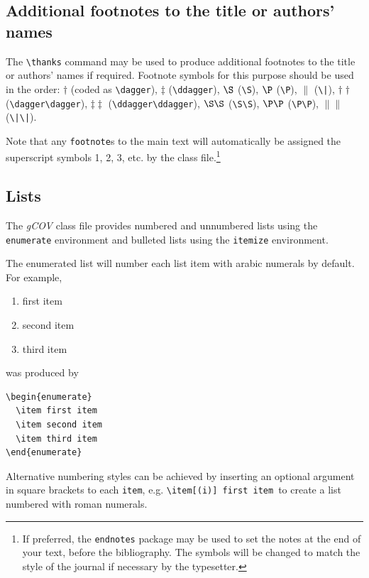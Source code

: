 \documentclass{gCOV2e}
\theoremstyle{plain}%
\theoremstyle{definition}
\theoremstyle{remark}
\begin{document}
\subsection{Additional footnotes to the title or authors' names}

The \verb"\thanks" command may be used to produce additional footnotes to the title or authors' names if required.
Footnote symbols for this purpose should be used in the order:
$\dagger$ (coded as \verb"\dagger"), $\ddagger$ (\verb"\ddagger"), $\S$ (\verb"\S"), $\P$ (\verb"\P"), $\|$ (\verb"\|"),\break
$\dagger\dagger$ (\verb"\dagger\dagger"), $\ddagger\ddagger$ (\verb"\ddagger\ddagger"), $\S\S$ (\verb"\S\S"),
$\P\P$ (\verb"\P\P"), $\|\|$ (\verb"\|\|").

Note that any \verb"footnote"s to the main text will automatically be assigned the superscript
 symbols 1, 2, 3, etc. by the class file.\footnote{If preferred, the \texttt{endnotes} package
 may be used to set the notes at the end of your text, before the bibliography.
 The symbols will be changed to match the style of the journal if necessary by the typesetter.}


\subsection{Lists}

The \textit{gCOV} class file provides numbered and unnumbered lists using the \texttt{enumerate} environment and bulleted
lists using the \texttt{itemize} environment.

The enumerated list will number each list item with arabic numerals by default. For example,
\begin{enumerate}
  \item first item
  \item second item
  \item third item
\end{enumerate}
was produced by
\begin{verbatim}
\begin{enumerate}
  \item first item
  \item second item
  \item third item
\end{enumerate}
\end{verbatim}
Alternative numbering styles can be achieved by inserting an optional argument in square brackets to each \verb"item", e.g. \verb"\item[(i)] first item"\, to create a list numbered with roman numerals.
\end{document}
